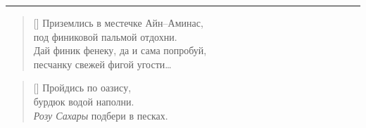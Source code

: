 \documentclass[a5paper,11pt]{memoir}
\begin{document}
\fancybreak{***}

\begin{verse}[\versewidth]
\hspace{1cm} Приземлись в местечке Айн--Аминас, \\
\hspace{1cm} под финиковой пальмой отдохни. \\
\hspace{1cm} Дай финик фенеку, да и сама попробуй, \\
\hspace{1cm} песчанку свежей фигой угости\ldots
\end{verse}


\begin{verse}[\versewidth]
\hspace{1cm} Пройдись по оазису, \\
\hspace{1cm} бурдюк водой наполни. \\
\hspace{1cm} \emph{Розу Сахары} подбери в песках. \\
\end{verse}
\end{document}

